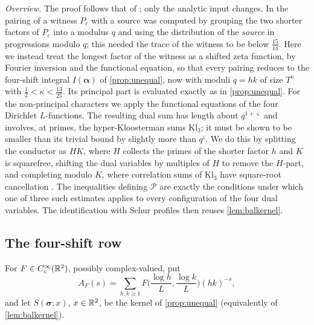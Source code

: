 \documentclass[11pt,colorlinks]{charlie}
\begin{document}
\emph{Overview.} The proof follows that of ; only the analytic input changes. In  the pairing of a witness $P_c$ with a source was computed by grouping the two shorter factors of $P_c$ into a modulus $q$ and using the distribution of the \emph{source} in progressions modulo $q$; this needed the trace of the witness to be below $\frac{15}{14}$. Here we instead treat the longest factor of the witness as a shifted zeta function, by Fourier inversion and the functional equation, so that every pairing reduces to the four-shift integral $I(\boldsymbol\alpha)$ of \cref{prop:unequal}, now with moduli $q=hk$ of size $T^\kappa$ with $\frac12<\kappa<\frac{13}{25}$. Its principal part is evaluated exactly as in \cref{prop:unequal}. For the non-principal characters we apply the functional equations of the four Dirichlet $L$-functions. The resulting dual sum has length about $q^{1+\varsigma}$ and involves, at primes, the hyper-Kloosterman sums $\mathrm{Kl}_3$; it must be shown to be smaller than its trivial bound by slightly more than $q^\varsigma$. We do this by splitting the conductor as $HK$, where $H$ collects the primes of the shorter factor $h$ and $K$ is squarefree, shifting the dual variables by multiples of $H$ to remove the $H$-part, and completing modulo $K$, where correlation sums of $\mathrm{Kl}_3$ have square-root cancellation \cite{FKM}. The inequalities defining $\mathcal P$ are exactly the conditions under which one of three such estimates applies to every configuration of the four dual variables. The identification with Schur profiles then reuses \cref{lem:balkernel}.

\subsection{The four-shift row}
For $F\in C_c^\infty(\mathbb{R}^2)$, possibly complex-valued, put
\[
 A_F(s)=\sum_{h,k\ge1}F\Big(\frac{\log h}L,\frac{\log k}L\Big)(hk)^{-s},
\]
and let $S(\boldsymbol\sigma;x)$, $x\in\mathbb{R}^2$, be the kernel of \cref{prop:unequal} (equivalently of \cref{lem:balkernel}).
\end{document}
